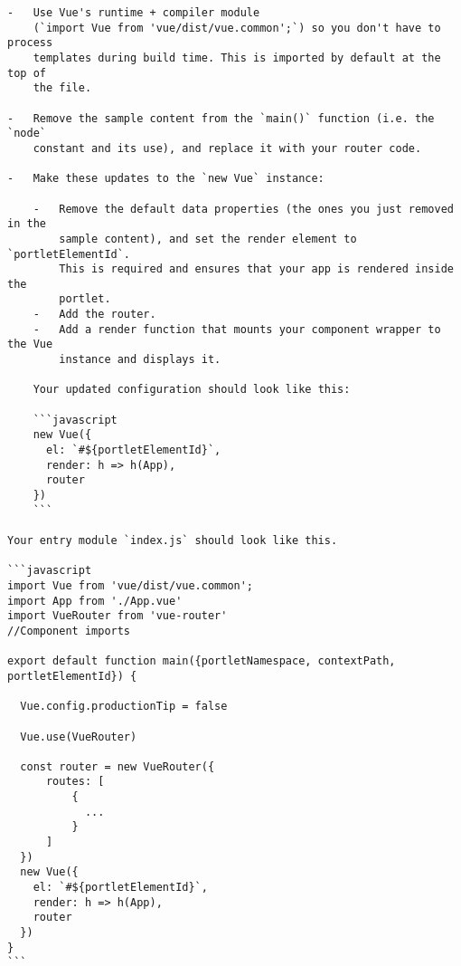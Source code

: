 \noindent\hrulefill

\begin{verbatim}
-   Use Vue's runtime + compiler module 
    (`import Vue from 'vue/dist/vue.common';`) so you don't have to process 
    templates during build time. This is imported by default at the top of 
    the file.

-   Remove the sample content from the `main()` function (i.e. the `node` 
    constant and its use), and replace it with your router code.

-   Make these updates to the `new Vue` instance:

    -   Remove the default data properties (the ones you just removed in the 
        sample content), and set the render element to `portletElementId`. 
        This is required and ensures that your app is rendered inside the 
        portlet.
    -   Add the router.
    -   Add a render function that mounts your component wrapper to the Vue 
        instance and displays it.
        
    Your updated configuration should look like this:

    ```javascript
    new Vue({
      el: `#${portletElementId}`,
      render: h => h(App),
      router
    })
    ```

Your entry module `index.js` should look like this. 

```javascript
import Vue from 'vue/dist/vue.common';
import App from './App.vue'
import VueRouter from 'vue-router'
//Component imports

export default function main({portletNamespace, contextPath, portletElementId}) {

  Vue.config.productionTip = false

  Vue.use(VueRouter)

  const router = new VueRouter({
      routes: [
          {
            ...
          }
      ]
  })
  new Vue({
    el: `#${portletElementId}`,
    render: h => h(App),
    router
  })
}
```
\end{verbatim}

